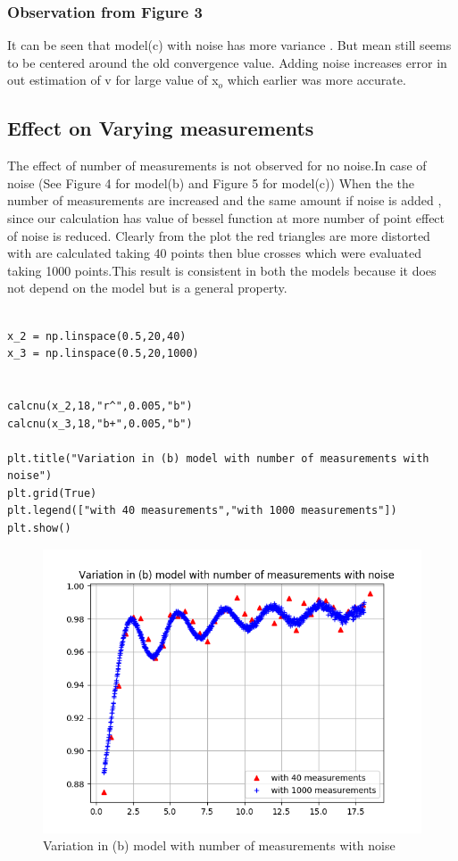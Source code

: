 \documentclass[a4paper]{article}
\begin{document}
\subsubsection{Observation from Figure 3}
It can be seen that model(c) with noise has more variance . But mean still seems to be centered around the old convergence value. Adding noise increases error in out estimation of v for large value of x$_{o}$ which earlier was more accurate.
\subsection{Effect on Varying measurements}
The effect of number of measurements is not observed for no noise.In case of noise (See Figure 4 for model(b) and Figure 5 for model(c)) When the the number of measurements are increased and the same amount if noise is added , since our calculation has value of bessel function at more number of point effect of noise is reduced. Clearly from the plot the red triangles are more distorted with are calculated taking 40 points then blue crosses which were evaluated taking 1000 points.This result is consistent in both the models because it does not depend on the model but is a general property.
\begin{lstlisting}

x_2 = np.linspace(0.5,20,40)
x_3 = np.linspace(0.5,20,1000)


calcnu(x_2,18,"r^",0.005,"b")
calcnu(x_3,18,"b+",0.005,"b")

plt.title("Variation in (b) model with number of measurements with noise")
plt.grid(True)
plt.legend(["with 40 measurements","with 1000 measurements"])
plt.show()

\end{lstlisting}
\begin{figure}
\includegraphics[width=\columnwidth]{Figure_1-3b.png}
\caption{Variation in (b) model with number of measurements with noise}
\end{figure}
\end{document}
